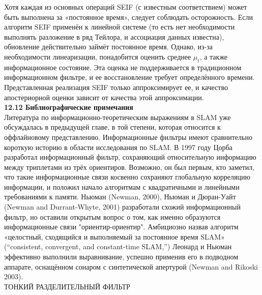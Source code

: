 \documentclass[10pt,a4paper]{article}
\begin{document}
Хотя каждая из основных операций SEIF (с известным соответствием) может быть выполнена за «постоянное время», следует соблюдать осторожность. Если алгоритм SEIF применён к линейной системе (то есть нет необходимости выполнять разложение в ряд Тейлора, и ассоциация данных известна), обновление действительно займёт постоянное время. Однако, из-за необходимости линеаризации, понадобится оценить среднее $\mu_t$, а также информационное состояние. Эта оценка не поддерживается в традиционном информационном фильтре, и ее восстановление требует определённого времени. Представленная реализация SEIF только аппроксимирует ее, и качество апостериорной оценки зависит от качества этой аппроксимации.\\

\textbf{12.12	Библиографические примечания}\\

Литература по информационно-теоретическим выражениям в SLAM уже обсуждалась в предыдущей главе, в той степени, которая относится к оффлайновому представлению. Информационные фильтры имеют сравнительно короткую историю в области исследования по SLAM. В 1997 году Цорба разработал информационный фильтр, сохраняющий относительную информацию между триплетами из трёх ориентиров. Возможно, он был первым, кто заметил, что такие информационные связи косвенно сохраняют глобальную корреляцию информации, и положил начало алгоритмам с квадратичными и линейными требованиями к памяти. Ньюман (Newman, 2000), Ньюман и Дюран-Уайт (Newman and Durrant-Whyte, 2001) разработали схожий информационный фильтр, но оставили открытым вопрос о том, как именно образуются информационные связи "ориентир-ориентир". Амбициозно назвав алгоритм «целостный, сходящийся и выполняемый за постоянное время SLAM» (“consistent, convergent, and constant-time SLAM,”) Леонард и Ньюман эффективно выполнили выравнивание, успешно применив его в подводном аппарате, оснащённом сонаром с синтетической апертурой (Newman and Rikoski 2003).\\

ТОНКИЙ РАЗДЕЛИТЕЛЬНЫЙ ФИЛЬТР\\
\end{document}
